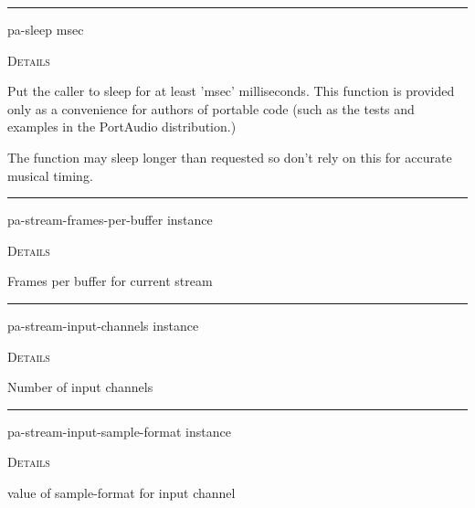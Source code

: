 \documentclass[a4paper]{report}
\begin{document}
  

    \rule{\linewidth}{0.1mm}
    
    \label{portaudio__fun__pa-sleep}
    \begin{defun}[Function]
    pa-sleep msec


	
    \bigskip
    \textsc{Details}


Put the caller to sleep for at least 'msec' milliseconds. This function is provided only as a convenience for authors of portable code (such as the tests and examples in the PortAudio distribution.)


The function may sleep longer than requested so don't rely on this for accurate musical timing.


    
    \end{defun}
  
  

    \rule{\linewidth}{0.1mm}
    
    \label{portaudio__fun__pa-stream-frames-per-buffer}
    \begin{defun}[Function]
    pa-stream-frames-per-buffer instance


	
    \bigskip
    \textsc{Details}

Frames per buffer for current stream


    
    \end{defun}
  
  

    \rule{\linewidth}{0.1mm}
    
    \label{portaudio__fun__pa-stream-input-channels}
    \begin{defun}[Function]
    pa-stream-input-channels instance


	
    \bigskip
    \textsc{Details}

Number of input channels


    
    \end{defun}
  
  

    \rule{\linewidth}{0.1mm}
    
    \label{portaudio__fun__pa-stream-input-sample-format}
    \begin{defun}[Function]
    pa-stream-input-sample-format instance


	
    \bigskip
    \textsc{Details}

value of sample-format for input channel


    
    \end{defun}
  
\end{document}
